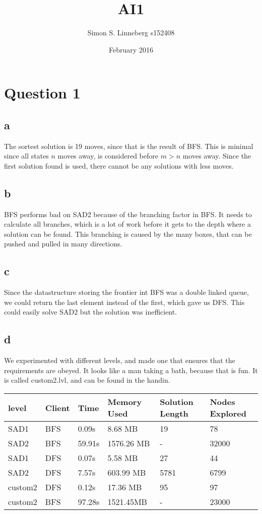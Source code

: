 \documentclass{article}
\title{AI1}
\author{Simon S. Linneberg s152408 }
\date{February 2016}
\begin{document}
\maketitle

\section{Question 1}
\subsection{ a }
The sortest solution is 19 moves, since that is the result of BFS. This is minimal since
all states $n$ moves away, is considered before $m > n$ moves away. Since the first
solution found is used, there cannot be any solutions with less moves.

\subsection{ b }
BFS performs bad on SAD2 because of the branching factor in BFS. It needs to calculate
all branches, which is a lot of work before it gets to the depth where a solution can be found.
This branching is caused by the many boxes, that can be pushed and pulled in many directions.\\

\subsection{c}
Since the datastructure storing the frontier int BFS was a double linked queue, we could
return the last element instead of the first, which gave us DFS. This could easily solve
SAD2 but the solution was inefficient.\\

\subsection{d}
We experimented with different levels, and made one that ensures that the requirements are obeyed.
It looks like a man taking a bath, because that is fun. It is called custom2.lvl, and can be found
in the handin.

\begin{tabular}{l|l|l|l|l|l}
  level & Client & Time & Memory Used & Solution Length & Nodes Explored\\\hline
  SAD1 & BFS & 0.09s & 8.68 MB & 19 & 78\\
  SAD2 & BFS & 59.91s & 1576.26 MB  & - & 32000\\
  SAD1 & DFS & 0.07s & 5.58 MB & 27 & 44\\
  SAD2 & DFS & 7.57s & 603.99 MB & 5781 & 6799\\
  custom2 & DFS & 0.12s & 17.36 MB & 95 & 97\\
  custom2 & BFS & 97.28s & 1521.45MB & - & 23000\\
\end{tabular}
\end{document}
